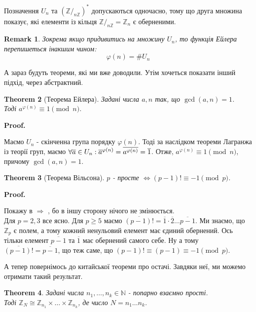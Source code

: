 \documentclass[a4paper, 14pt]{extarticle}
\makeatletter
\theoremstyle{theoremdd}
\newtheorem{theorem}{Theorem}[subsection]
\theoremstyle{theoremdd}
\theoremstyle{theoremdd}
\theoremstyle{theoremdd}
\theoremstyle{theoremdd}
\theoremstyle{theoremdd}
\newtheorem{remark}[theorem]{Remark}
\theoremstyle{theoremdd}
\theoremstyle{theoremdd}
\def\qed{$\blacksquare$}
\def\rightproof{$\boxed{\Rightarrow}$ }
\renewenvironment{proof}[1][Proof.\\]{\par
\pushQED{\hfill \qed}%
\normalfont \topsep6\p@\@plus6\p@\relax
\trivlist
\item\relax
{\bfseries
#1\@addpunct{.}}\hspace\labelsep\ignorespaces
}{%
\popQED\endtrivlist\@endpefalse
}
\makeatother
\begin{document}
Позначення $U_n$ та $(\mathbb{Z}/_{n \mathbb{Z}})^*$ допускаються одночасно, тому що друга множина показує, які елементи із кільця $\mathbb{Z}/_{n \mathbb{Z}} = \mathbb{Z}_n$ є оберненими.

\begin{remark}
Зокрема якщо придивитись на множину $U_n$, то функція Ейлера перепишеться інакшим чином:
$$\varphi(n) = \# U_n$$
\end{remark}

А зараз будуть теореми, які ми вже доводили. Утім хочеться показати інший підхід, через абстрактний.
\begin{theorem}[Теорема Ейлера]
Задані числа $a,n$ так, що $\gcd(a,n) = 1$.\\
Тоді $a^{\varphi(n)} \equiv 1 \pmod n$.
\end{theorem}

\begin{proof}
Маємо $U_n$ - скінченна група порядку $\varphi(n)$. Тоді за наслідком теореми Лагранжа із теорії груп, маємо $\forall \overline{a} \in U_n: \\
\overline{a}^{\varphi(n)} = \overline{a^{\varphi(n)}} = \overline{1}$. Отже, $a^{\varphi(n)} \equiv 1 \pmod n$, причому $\gcd(a,n)=1$.
\end{proof}

\begin{theorem}[Теорема Вільсона]
$p$ - просте $\iff (p-1)! \equiv -1 \pmod p$.
\end{theorem}

\begin{proof}
Покажу в \rightproof, бо в іншу сторону нічого не змінюється. \\
Для $p = 2,3$ все ясно. Для $p \geq 5$ маємо $\overline{(p-1)!} = \overline{1} \cdot \overline{2} \dots \overline{p-1}$. Ми знаємо, що $\mathbb{Z}_p$ є полем, а тому кожний ненульовий елемент має єдиний обернений. Ось тільки елемент $\overline{p-1}$ та $\overline{1}$ має обернений самого себе. Ну а тому\\
$\overline{(p-1)!} = \overline{p-1}$, що теж саме, що $(p-1)! \equiv (p-1) \equiv -1 \pmod p$.
\end{proof}

А тепер повернімось до китайської теореми про остачі. Завдяки неї, ми можемо отримати такий результат.
\begin{theorem}
Задані числа $n_1,\dots,n_k \in \mathbb{N}$ - попарно взаємно прості.\\
Тоді $\mathbb{Z}_N \cong \mathbb{Z}_{n_1} \times \dots \times \mathbb{Z}_{n_k}$, де число $N = n_1 \dots n_k$.
\end{theorem}
\end{document}
